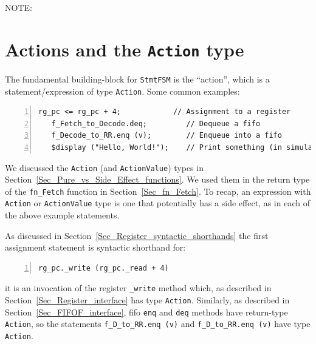 \vspace{2ex}

NOTE: 


\section{Actions and the {\tt Action} type}


The fundamental building-block for \verb|StmtFSM| is the ``action'',
which is a statement/expression of type \verb|Action|.  Some common
examples:

{\footnotesize
\begin{Verbatim}[frame=single, numbers=left]
   rg_pc <= rg_pc + 4;            // Assignment to a register
   f_Fetch_to_Decode.deq;         // Dequeue a fifo
   f_Decode_to_RR.enq (v);        // Enqueue into a fifo
   $display ("Hello, World!");    // Print something (in simulation only)
\end{Verbatim}
}

We discussed the \verb|Action| (and \verb|ActionValue|) types in
Section~\ref{Sec_Pure_vs_Side_Effect_functions}.  We used them in the
return type of the \verb|fn_Fetch| function in
Section~\ref{Sec_fn_Fetch}.  To recap, an expression with
\verb|Action| or \verb|ActionValue| type is one that potentially has a
side effect, as in each of the above example statements.

As discussed in Section~\ref{Sec_Register_syntactic_shorthands} the
first assignment statement is syntactic shorthand for:

{\footnotesize
\begin{Verbatim}[frame=single, numbers=left]
   rg_pc._write (rg_pc._read + 4)
\end{Verbatim}
}

{\ie} it is an invocation of the register \verb|_write| method which,
as described in
Section~\ref{Sec_Register_interface} has type
\verb|Action|.  Similarly, as described in
Section~\ref{Sec_FIFOF_interface}, fifo \verb|enq|
and \verb|deq| methods have return-type \verb|Action|, so the
statements \verb|f_D_to_RR.enq (v)| and \verb|f_D_to_RR.enq (v)| have
type \verb|Action|.

